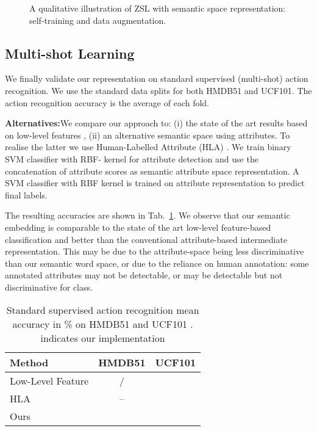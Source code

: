 \documentclass{article}
\begin{document}
\begin{figure}
\vspace{-0.4cm}
\caption{A qualitative illustration of ZSL with semantic space representation: self-training and data augmentation.}
\vspace{-0.4cm}
\label{fig:TSNE_visualization}
\end{figure}


\vspace{-0.2cm}
\subsection{Multi-shot Learning}\label{sect:MultishotLearning}

We finally validate our representation on standard supervised (multi-shot) action recognition. We use the standard data splits for both HMDB51\cite{Kuehne2011} and UCF101\cite{Soomro2012}. The action recognition accuracy is the average of each fold. 

\noindent \textbf{Alternatives:}\quad We compare our approach to: (i) the state of the art results based on low-level features \cite{Wang2013}, (ii) an alternative semantic space using attributes. To realise the latter we use Human-Labelled Attribute (HLA) \cite{Zheng2014}. We train binary SVM classifier with RBF- kernel for attribute detection and use the concatenation of attribute scores as semantic attribute space representation. A SVM  classifier with RBF kernel is trained on attribute representation to predict final labels. 

The resulting accuracies are shown in Tab.~\ref{tab:MultishotAcc}. We  observe that our semantic embedding  is comparable to the state of the art low-level feature-based classification and better than the conventional attribute-based intermediate representation. This may be due to the attribute-space being less discriminative than our semantic word space, or due to the reliance on human annotation: some annotated attributes may not be detectable, or may be detectable but not discriminative for class. 

\begin{table}[t]
  \centering
  \caption{Standard supervised action recognition mean accuracy in \% on HMDB51 and UCF101 .  indicates our implementation}
    \begin{tabular}{lcr}
    \toprule
     Method     & HMDB51 & UCF101 \\
    \midrule
    Low-Level Feature\cite{Wang2013} & / & \multicolumn{1}{c}{} \\
    HLA~\cite{Zheng2014} & -- & \multicolumn{1}{c}{} \\
    Ours  &   & \multicolumn{1}{c}{} \\
    \bottomrule
    \end{tabular}\label{tab:MultishotAcc}\vspace{-0.3cm}
\end{table}
\end{document}
